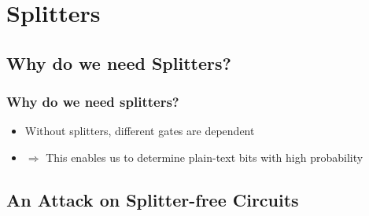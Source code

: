 \documentclass{beamer}
\begin{document}
\section{Splitters}

\subsection{Why do we need Splitters?}

\begin{frame}
  \frametitle{Why do we need splitters?}
  \begin{itemize}
  \item Without splitters, different gates are dependent
  \item $\Rightarrow$ This enables us to determine plain-text bits with high probability
  \end{itemize}
\end{frame}

\subsection{An Attack on Splitter-free Circuits}
\end{document}
